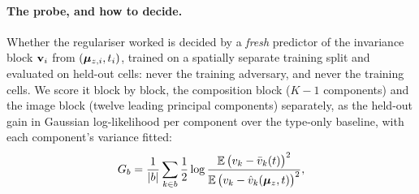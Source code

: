 \paragraph{The probe, and how to decide.}
  Whether the regulariser worked is decided by a \emph{fresh} predictor of the invariance block $\mathbf{v}_i$ from $(\boldsymbol{\mu}_{z,i}, t_i)$, trained on a spatially separate training split and evaluated on held-out cells: never the training adversary, and never the training cells. We score it block by block, the composition block ($K-1$ components) and the image block (twelve leading principal components) separately, as the held-out gain in Gaussian log-likelihood per component over the type-only baseline, with each component's variance fitted:
\begin{equation}
  G_b = \frac{1}{|b|}\sum_{k \in b} \frac{1}{2}\log \frac{\operatorname{\mathbb{E}}\big(v_k - \bar v_k(t)\big)^2}{\operatorname{\mathbb{E}}\big(v_k - \hat v_k(\boldsymbol{\mu}_z, t)\big)^2},
  \label{eq:probe}
\end{equation}
